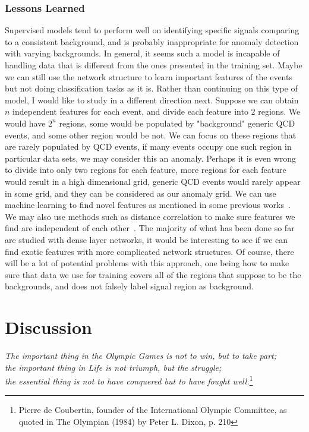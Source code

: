 \documentclass[a4paper,11pt]{article}
\begin{document}
\subsubsection{Lessons Learned}
\label{sec:lessons}

Supervised models tend to perform well on identifying specific signals comparing to a consistent background, and is probably inappropriate for anomaly detection with varying backgrounds. In general, it seems such a model is incapable of handling data that is different from the ones presented in the training set. Maybe we can still use the network structure to learn important features of the events but not doing classification tasks as it is. Rather than continuing on this type of model, I would like to study in a different direction next. Suppose we can obtain $n$ independent features for each event, and divide each feature into $2$ regions. We would have $2^n$ regions, some would be populated by "background" generic QCD events, and some other region would be not. We can focus on these regions that are rarely populated by QCD events, if many events occupy one such region in particular data sets, we may consider this an anomaly. Perhaps it is even wrong to divide into only two regions for each feature, more regions for each feature would result in a high dimensional grid, generic QCD events would rarely appear in some grid, and they can be considered as our anomaly grid. We can use machine learning to find novel features as mentioned in some previous works~\cite{Datta:2017lxt}. We may also use methods such as distance correlation to make sure features we find are independent of each other~\cite{DiscoFever}. The majority of what has been done so far are studied with dense layer networks, it would be interesting to see if we can find exotic features with more complicated network structures. Of course, there will be a lot of potential problems with this approach, one being how to make sure that data we use for training covers all of the regions that suppose to be the backgrounds, and does not falsely label signal region as background.


 \FloatBarrier

\clearpage

\section{Discussion}
\label{sec:discussion}


\begin{center}
\textit{The important thing in the Olympic Games is not to win, but to take part;\\ the important thing in Life is not triumph, but the struggle; \\the essential thing is not to have conquered but to have fought well.}\footnote{Pierre de Coubertin, founder of the International Olympic Committee, as quoted in The Olympian (1984) by Peter L. Dixon, p. 210}
\end{center}
\end{document}
